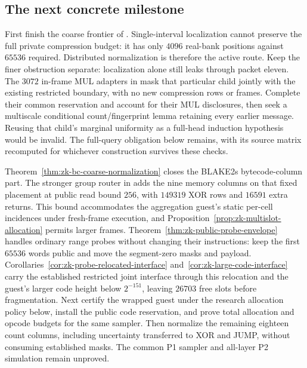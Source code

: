 \subsection{The next concrete milestone}\label{sec:zk-next}

First finish the coarse frontier of . Single-interval localization cannot preserve the full private compression budget: it has only $4096$ real-bank positions against $65536$ required. Distributed normalization is therefore the active route. Keep the finer obstruction separate: localization alone still leaks through packet eleven. The $3072$ in-frame MUL adapters in  mask that particular child jointly with the existing restricted boundary, with no new compression rows or frames. Complete their common reservation and account for their MUL disclosures, then seek a multiscale conditional count/fingerprint lemma retaining every earlier message. Reusing that child's marginal uniformity as a full-head induction hypothesis would be invalid. The full-query obligation below remains, with its source matrix recomputed for whichever construction survives these checks.

Theorem~\ref{thm:zk-bc-coarse-normalization} closes the BLAKE2s bytecode-column part. The stronger group router in  adds the nine memory columns on that fixed placement at public read bound $256$, with $149319$ XOR rows and $16591$ extra returns. This bound accommodates the aggregation guest's static per-cell incidences under fresh-frame execution, and Proposition~\ref{prop:zk-multislot-allocation} permits larger frames. Theorem~\ref{thm:zk-public-probe-envelope} handles ordinary range probes without changing their instructions: keep the first $65536$ words public and move the segment-zero masks and payload. Corollaries~\ref{cor:zk-probe-relocated-interface} and~\ref{cor:zk-large-code-interface} carry the established restricted joint interface through this relocation and the guest's larger code height below $2^{-151}$, leaving $26703$ free slots before fragmentation. Next certify the wrapped guest under the research allocation policy below, install the public code reservation, and prove total allocation and opcode budgets for the same sampler. Then normalize the remaining eighteen count columns, including uncertainty transferred to XOR and JUMP, without consuming established masks. The common P1 sampler and all-layer P2 simulation remain unproved.

